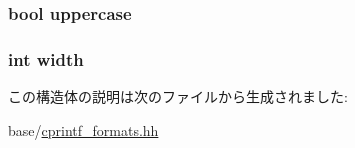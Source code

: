 \label{structcp_1_1Format_ab7c37fe3cbc5111a30a7b3c23f6cd95d}
\hypertarget{structcp_1_1Format_acf08089b3da2364267676e8d54503bb7}{
\subsubsection[{uppercase}]{\setlength{\rightskip}{0pt plus 5cm}bool {\bf uppercase}}}
\label{structcp_1_1Format_acf08089b3da2364267676e8d54503bb7}
\hypertarget{structcp_1_1Format_a2474a5474cbff19523a51eb1de01cda4}{
\subsubsection[{width}]{\setlength{\rightskip}{0pt plus 5cm}int {\bf width}}}
\label{structcp_1_1Format_a2474a5474cbff19523a51eb1de01cda4}


この構造体の説明は次のファイルから生成されました:\begin{DoxyCompactItemize}
\item 
base/\hyperlink{cprintf__formats_8hh}{cprintf\_\-formats.hh}\end{DoxyCompactItemize}
